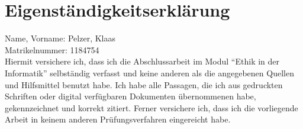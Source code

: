 \section*{Eigenständigkeitserklärung}
Name, Vorname: Pelzer, Klaas\\
Matrikelnummer: 1184754\\

Hiermit versichere ich, dass ich die Abschlussarbeit im Modul \enquote{Ethik in der Informatik} selbständig verfasst und keine
anderen als die angegebenen Quellen und Hilfsmittel benutzt habe.
Ich habe alle Passagen, die ich aus gedruckten Schriften oder digital verfügbaren Dokumenten übernommenen habe,
gekennzeichnet und korrekt zitiert.
Ferner versichere ich, dass ich die vorliegende Arbeit in keinem anderen Prüfungsverfahren eingereicht habe.